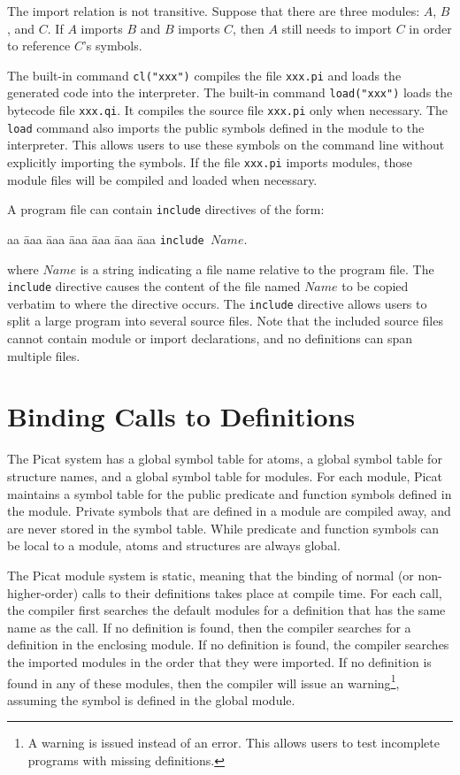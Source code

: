 The import relation is not transitive. Suppose that there are three modules: $A$, $B$, and $C$. If $A$ imports $B$ and $B$ imports $C$, then $A$ still needs to import $C$ in order to reference $C$'s symbols.

The built-in command \texttt{cl("xxx")} compiles the file \texttt{xxx.pi} and loads the generated code into the interpreter. The built-in command \texttt{load("xxx")} loads the bytecode file \texttt{xxx.qi}. It compiles the source file \texttt{xxx.pi} only when necessary. The \texttt{load} command  also imports the public symbols defined in the module to the interpreter.  This allows users to use these symbols on the command line without explicitly importing the symbols. If the file \texttt{xxx.pi} imports modules, those module files will be compiled and loaded when necessary. 

A program file can contain \texttt{include} directives of the form:
\begin{tabbing}
aa \= aaa \= aaa \= aaa \= aaa \= aaa \= aaa \kill
\> \texttt{include $Name$}.
\end{tabbing}
where $Name$ is a string indicating a file name relative to the program file. The \texttt{include} directive causes the content of the file named $Name$ to be copied verbatim to where the directive occurs. The \texttt{include} directive allows users to split a large program into several source files. Note that the included source files cannot contain module or import declarations, and no definitions can span multiple files.

\section{Binding Calls to Definitions}
The Picat system has a global symbol table for atoms, a global symbol table for structure names, and a global symbol table for modules. For each module, Picat maintains a symbol table for the public predicate and function symbols defined in the module. Private symbols that are defined in a module are compiled away, and are never stored in the symbol table. While predicate and function symbols can be local to a module, atoms and structures are always global.

The Picat module system is static, meaning that the binding of normal (or non-higher-order) calls to their definitions takes place at compile time. For each call, the compiler first searches the default modules for a definition that has the same name as the call. If no definition is found, then the compiler searches for a definition in the enclosing module. If no definition is found, the compiler searches the imported modules in the order that they were imported. If no definition is found in any of these modules, then the compiler will issue an warning\footnote{A warning is issued instead of an error.  This allows users to test incomplete programs with missing definitions.}, assuming the symbol is defined in  the global module.

